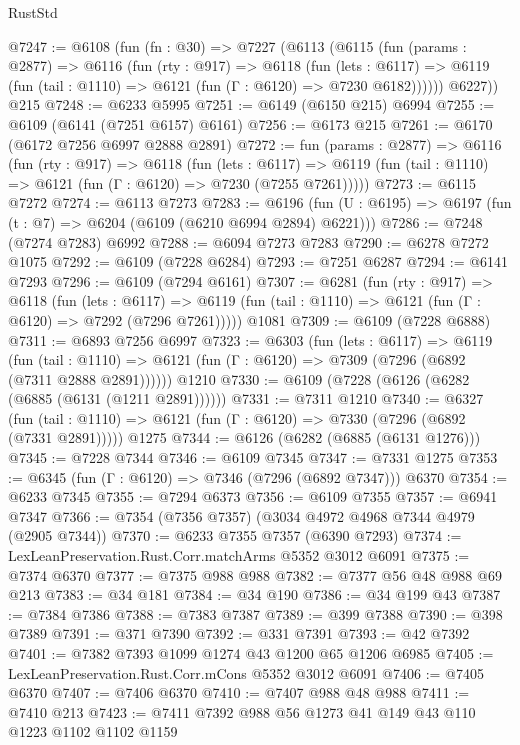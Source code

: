 \begin{lexlean}{RustStd}
\begin{coremodule}
@7247 := @6108
    (fun (fn : @30) =>
    @7227
      (@6113
        (@6115
          (fun (params : @2877) =>
          @6116
            (fun (rty : @917) =>
            @6118
              (fun (lets : @6117) =>
              @6119 (fun (tail : @1110) => @6121 (fun (Γ : @6120) => @7230 @6182))))))
        @6227))
    @215
@7248 := @6233 @5995
@7251 := @6149 (@6150 @215) @6994
@7255 := @6109 (@6141 (@7251 @6157) @6161)
@7256 := @6173 @215
@7261 := @6170 (@6172 @7256 @6997 @2888 @2891)
@7272 := fun (params : @2877) =>
  @6116
    (fun (rty : @917) =>
    @6118
      (fun (lets : @6117) =>
      @6119 (fun (tail : @1110) => @6121 (fun (Γ : @6120) => @7230 (@7255 @7261)))))
@7273 := @6115 @7272
@7274 := @6113 @7273
@7283 := @6196 (fun (U : @6195) => @6197 (fun (t : @7) => @6204 (@6109 (@6210 @6994 @2894) @6221)))
@7286 := @7248 (@7274 @7283) @6992
@7288 := @6094 @7273 @7283
@7290 := @6278 @7272 @1075
@7292 := @6109 (@7228 @6284)
@7293 := @7251 @6287
@7294 := @6141 @7293
@7296 := @6109 (@7294 @6161)
@7307 := @6281
    (fun (rty : @917) =>
    @6118
      (fun (lets : @6117) =>
      @6119 (fun (tail : @1110) => @6121 (fun (Γ : @6120) => @7292 (@7296 @7261)))))
    @1081
@7309 := @6109 (@7228 @6888)
@7311 := @6893 @7256 @6997
@7323 := @6303
    (fun (lets : @6117) =>
    @6119
      (fun (tail : @1110) => @6121 (fun (Γ : @6120) => @7309 (@7296 (@6892 (@7311 @2888 @2891))))))
    @1210
@7330 := @6109 (@7228 (@6126 (@6282 (@6885 (@6131 (@1211 @2891))))))
@7331 := @7311 @1210
@7340 := @6327
    (fun (tail : @1110) => @6121 (fun (Γ : @6120) => @7330 (@7296 (@6892 (@7331 @2891)))))
    @1275
@7344 := @6126 (@6282 (@6885 (@6131 @1276)))
@7345 := @7228 @7344
@7346 := @6109 @7345
@7347 := @7331 @1275
@7353 := @6345 (fun (Γ : @6120) => @7346 (@7296 (@6892 @7347))) @6370
@7354 := @6233 @7345
@7355 := @7294 @6373
@7356 := @6109 @7355
@7357 := @6941 @7347
@7366 := @7354 (@7356 @7357) (@3034 @4972 @4968 @7344 @4979 (@2905 @7344))
@7370 := @6233 @7355 @7357 (@6390 @7293)
@7374 := LexLeanPreservation.Rust.Corr.matchArms @5352 @3012 @6091
@7375 := @7374 @6370
@7377 := @7375 @988 @988
@7382 := @7377 @56 @48 @988 @69 @213
@7383 := @34 @181
@7384 := @34 @190
@7386 := @34 @199 @43
@7387 := @7384 @7386
@7388 := @7383 @7387
@7389 := @399 @7388
@7390 := @398 @7389
@7391 := @371 @7390
@7392 := @331 @7391
@7393 := @42 @7392
@7401 := @7382 @7393 @1099 @1274 @43 @1200 @65 @1206 @6985
@7405 := LexLeanPreservation.Rust.Corr.mCons @5352 @3012 @6091
@7406 := @7405 @6370
@7407 := @7406 @6370
@7410 := @7407 @988 @48 @988
@7411 := @7410 @213
@7423 := @7411 @7392 @988 @56 @1273 @41 @149 @43 @110 @1223 @1102 @1102 @1159

\end{coremodule}
\end{lexlean}
